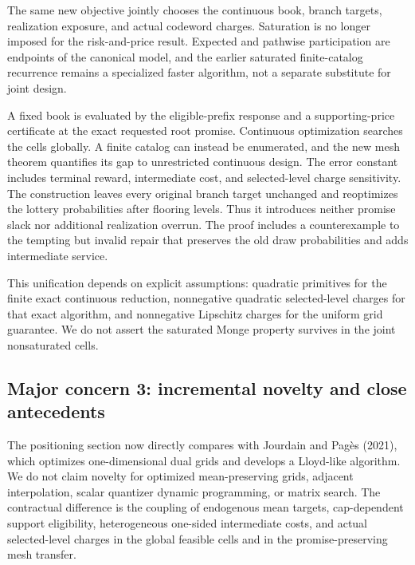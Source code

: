 \documentclass[11pt,letterpaper]{article}
\begin{document}
The same new objective jointly chooses the continuous book, branch targets, realization exposure, and actual codeword charges. Saturation is no longer imposed for the risk-and-price result. Expected and pathwise participation are endpoints of the canonical model, and the earlier saturated finite-catalog recurrence remains a specialized faster algorithm, not a separate substitute for joint design.



A fixed book is evaluated by the eligible-prefix response and a supporting-price certificate at the exact requested root promise. Continuous optimization searches the cells globally. A finite catalog can instead be enumerated, and the new mesh theorem quantifies its gap to unrestricted continuous design. The error constant includes terminal reward, intermediate cost, and selected-level charge sensitivity. The construction leaves every original branch target unchanged and reoptimizes the lottery probabilities after flooring levels. Thus it introduces neither promise slack nor additional realization overrun. The proof includes a counterexample to the tempting but invalid repair that preserves the old draw probabilities and adds intermediate service.



This unification depends on explicit assumptions: quadratic primitives for the finite exact continuous reduction, nonnegative quadratic selected-level charges for that exact algorithm, and nonnegative Lipschitz charges for the uniform grid guarantee. We do not assert the saturated Monge property survives in the joint nonsaturated cells.



\subsection*{Major concern 3: incremental novelty and close antecedents}


The positioning section now directly compares with Jourdain and Pagès (2021), which optimizes one-dimensional dual grids and develops a Lloyd-like algorithm. We do not claim novelty for optimized mean-preserving grids, adjacent interpolation, scalar quantizer dynamic programming, or matrix search. The contractual difference is the coupling of endogenous mean targets, cap-dependent support eligibility, heterogeneous one-sided intermediate costs, and actual selected-level charges in the global feasible cells and in the promise-preserving mesh transfer.
\end{document}
